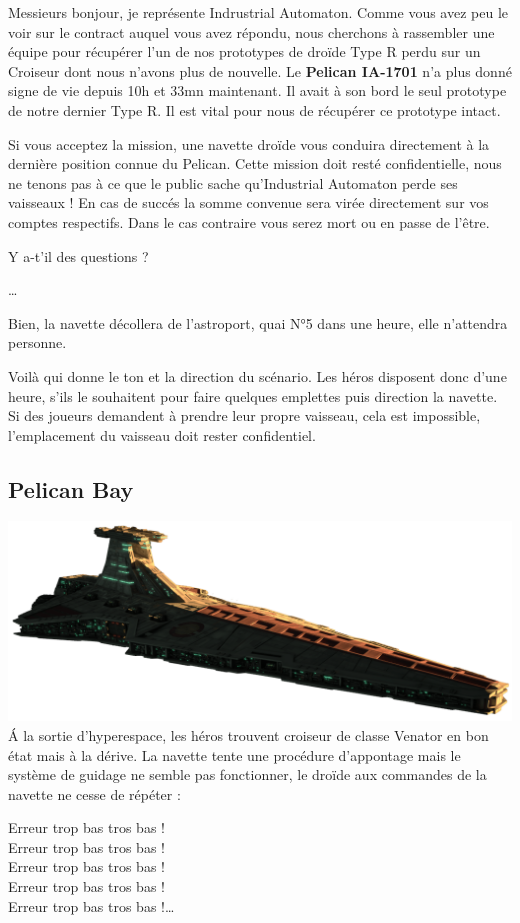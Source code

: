 \begin{quotebox}
	Messieurs bonjour, je représente Indrustrial Automaton.
	Comme vous avez peu le voir sur le contract auquel vous avez répondu, nous cherchons à rassembler une équipe pour récupérer l’un de nos prototypes de droïde Type R perdu sur un Croiseur dont nous n’avons plus de nouvelle.
	Le \textbf{Pelican IA-1701} n’a plus donné signe de vie depuis 10h et 33mn maintenant. Il avait à son bord le seul prototype de notre dernier Type R. Il est vital pour nous de récupérer ce prototype intact.

	Si vous acceptez la mission, une navette droïde vous conduira directement à la dernière position connue du Pelican. Cette mission doit resté confidentielle, nous ne tenons pas à ce que le public sache qu’Industrial Automaton perde ses vaisseaux !
	En cas de succés la somme convenue sera virée directement sur vos comptes respectifs. Dans le cas contraire vous serez mort ou en passe de l’être.

	Y a-t’il des questions ?

	\ldots

	Bien, la navette décollera de l’astroport, quai N°5 dans une heure, elle n’attendra personne.
\end{quotebox}

Voilà qui donne le ton et la direction du scénario. Les héros disposent donc d’une heure, s’ils le souhaitent pour faire quelques emplettes puis direction la navette. Si des joueurs demandent à prendre leur propre vaisseau, cela est impossible, l'emplacement du vaisseau doit rester confidentiel.

\subsection{Pelican Bay}
\includegraphics[width=\linewidth]{_img/dos-au-muur/venator.png}
\'A la sortie d’hyperespace, les héros trouvent croiseur de classe Venator en bon état mais à la dérive. La navette tente une procédure d’appontage mais le système de guidage ne semble pas fonctionner, le droïde aux commandes de la navette ne cesse de répéter :
\begin{quotebox}
	Erreur trop bas tros bas !\\
	Erreur trop bas tros bas !\\
	Erreur trop bas tros bas !\\
	Erreur trop bas tros bas !\\
	Erreur trop bas tros bas !\ldots
\end{quotebox}

